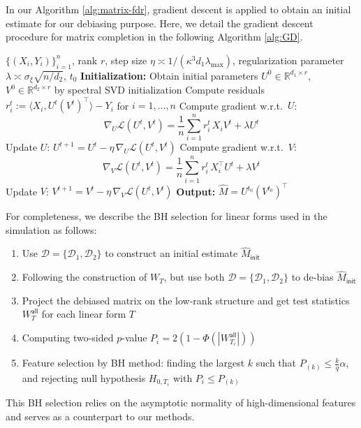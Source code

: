 \documentclass[12pt]{article}
\newcommand{\abs}[1]{\left\lvert#1\right\rvert}
\newcommand{\cD}{\mathcal{D}}
\theoremstyle{plain}
\begin{document}
In our Algorithm \ref{alg:matrix-fdr}, gradient descent is applied to obtain an initial estimate for our debiasing purpose. Here, we detail the gradient descent procedure for matrix completion in the following Algorithm \ref{alg:GD}.


\begin{algorithm}[H]
\caption{Gradient Descent for Matrix Completion (\cite{chen2019inference,chen2020noisy})}
\label{alg:GD}
\begin{algorithmic}[1]
\REQUIRE $\{(X_i,Y_i)\}_{i=1}^n$, rank $r$, step size $\eta\asymp1/(\kappa^3d_1\lambda_{\max})$, regularization parameter $\lambda\asymp \sigma_{\xi}\sqrt{n/d_2}$, $t_0$
\STATE \textbf{Initialization:} Obtain initial parameters
$U^0 \in \mathbb{R}^{d_1\times r}$,
$V^0 \in \mathbb{R}^{d_2\times r}$ by spectral SVD initialization
    \STATE Compute residuals $r_i^t := \langle X_i, U^t (V^t)^\top\rangle - Y_i$ for $i=1,\dots,n$
    \STATE Compute gradient w.r.t.\ $U$:
    \[
    \nabla_U \mathcal{L}(U^t,V^t)
    =
    \frac{1}{n}
    \sum_{i=1}^n
    r_i^t \, X_i V^t
    + \lambda U^t
    \]
    \STATE Update $U$:
    $
    U^{t+1}
    =
    U^t
    -
    \eta \, \nabla_U \mathcal{L}(U^t,V^t)
    $
    \STATE Compute gradient w.r.t.\ $V$:
    \[
    \nabla_V \mathcal{L}(U^t,V^t)
    =
    \frac{1}{n}
    \sum_{i=1}^n
    r_i^t \, X_i^\top U^t
    + \lambda V^t
    \]
    \STATE Update $V$:
    $
    V^{t+1}
    =
    V^t
    -
    \eta \, \nabla_V \mathcal{L}(U^t,V^t)
    $
\ENDFOR
\STATE \textbf{Output:} $\widehat{M} =  U^{t_0} ( V^{t_0})^{\top} $
\end{algorithmic}
\end{algorithm}


For completeness, we describe the BH selection for linear forms used in the simulation as follows:
\begin{enumerate}
    \item Use $\cD=\{\cD_1,\cD_2\}$ to construct an initial estimate $\widehat{M}_{\mathsf{init}}$ 
    \item Following the construction of $W_T$, but use both $\cD=\{\cD_1,\cD_2\}$ to de-bias $\widehat{M}_{\mathsf{init}}$
    \item Project the debiased matrix on the low-rank structure and get test statistics $W_T^{\mathsf{all} }$ for each linear form $T$
    \item Computing two-sided $p$-value $P_i=2(1-\Phi(\abs{W_{T_i}^{\mathsf{all}} }))$
    \item Feature selection by BH method: finding the largest $k$ such that $P_{(k)} \leq \frac{k}{q} \alpha$, and rejecting null hypothesis $H_{0,T_i }$ with  $P_i\le P_{(k)}$
\end{enumerate}
This BH selection relies on the asymptotic normality of high-dimensional features and serves as a counterpart to our methods. 
\end{document}
